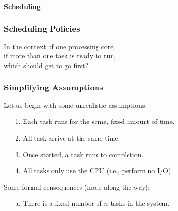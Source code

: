 \begin{frame}

\begin{center}

\Huge \textbf{Scheduling}

\end{center}

\end{frame}


\begin{frame}

\frametitle{Scheduling Policies}

\vspace{\fill}

\begin{center}


In the context of one processing core, \\ if more than one task is ready to
run, \\ which should get to go first?

\end{center}

\vspace{\fill}

\end{frame}


\begin{frame}

\frametitle{Simplifying Assumptions}

Let us begin with some unrealistic assumptions:

\begin{itemize}

\item[1.] Each task runs for the same, fixed amount of time.

\item[2.] All task arrive at the same time.

\item[3.] Once started, a task runs to completion.

\item[4.] All tasks only use the CPU (i.e., perform no I/O)


\end{itemize}

\vspace{\fill}

Some formal consequences (more along the way):

\begin{itemize}

\item[a.] There is a fixed number of $n$ tasks in the system.

\end{itemize}

\end{frame}


